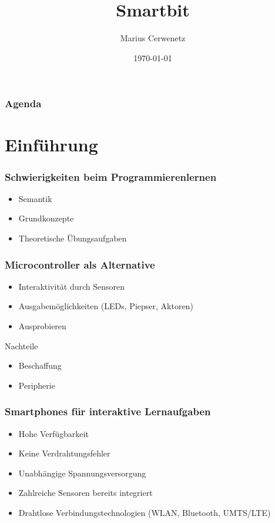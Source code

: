 \documentclass{beamer}
\title{Smartbit}
\author{Marius Cerwenetz}
\institute{Institut für Softwaretechnik und Datenkommunikation}
\date{\today}
\begin{document}
\frame{\titlepage}

\logo{}

\setcounter{tocdepth}{1}
\begin{frame}
\frametitle{Agenda}
\tableofcontents

\end{frame}

\section{Einführung}

\begin{frame}
    \frametitle{Schwierigkeiten beim Programmierenlernen}
    \begin{itemize}
        \item Semantik
        \item Grundkonzepte
        \item Theoretische Übungsaufgaben
    \end{itemize}
\end{frame}

\begin{frame}
    \frametitle{Microcontroller als Alternative}
    \begin{itemize}
        \item Interaktivität durch Sensoren
        \item Ausgabemöglichkeiten (LEDs, Piepser, Aktoren)
        \item Ausprobieren
    \end{itemize}

    \begin{alertblock}{Nachteile}
        \begin{itemize}
            \item Beschaffung
            \item Peripherie
        \end{itemize}
    \end{alertblock}
\end{frame}



\begin{frame}
    \frametitle{Smartphones für interaktive Lernaufgaben}
    \begin{itemize}
        \item Hohe Verfügbarkeit
        \item Keine Verdrahtungsfehler
        \item Unabhängige Spannungsversorgung
        \item Zahlreiche Sensoren bereits integriert
        \item Drahtlose Verbindungstechnologien (WLAN, Bluetooth, UMTS/LTE)
    \end{itemize}
\end{frame}
\end{document}
